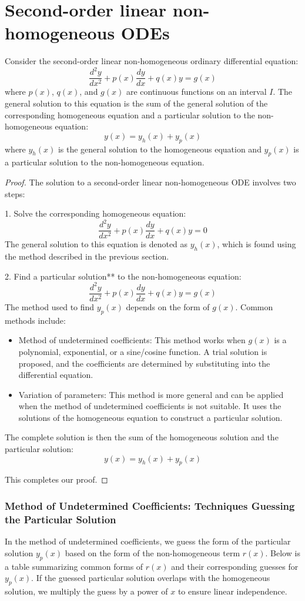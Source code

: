 \section{Second-order linear non-homogeneous ODEs}
\begin{theorem}
Consider the second-order linear non-homogeneous ordinary differential equation:
\[
\frac{d^2 y}{dx^2} + p(x)\frac{dy}{dx} + q(x)y = g(x)
\]
where $p(x)$, $q(x)$, and $g(x)$ are continuous functions on an interval $I$. The general solution to this equation is the sum of the general solution of the corresponding homogeneous equation and a particular solution to the non-homogeneous equation:
\[
y(x) = y_h(x) + y_p(x)
\]
where $y_h(x)$ is the general solution to the homogeneous equation and $y_p(x)$ is a particular solution to the non-homogeneous equation.
\end{theorem}

\begin{proof}
The solution to a second-order linear non-homogeneous ODE involves two steps:

1. Solve the corresponding homogeneous equation:
\[
\frac{d^2 y}{dx^2} + p(x)\frac{dy}{dx} + q(x)y = 0
\]
The general solution to this equation is denoted as $y_h(x)$, which is found using the method described in the previous section.

2. Find a particular solution** to the non-homogeneous equation:
\[
\frac{d^2 y}{dx^2} + p(x)\frac{dy}{dx} + q(x)y = g(x)
\]
The method used to find $y_p(x)$ depends on the form of $g(x)$. Common methods include:
\begin{itemize}
    \item Method of undetermined coefficients: This method works when $g(x)$ is a polynomial, exponential, or a sine/cosine function. A trial solution is proposed, and the coefficients are determined by substituting into the differential equation.
    \item Variation of parameters: This method is more general and can be applied when the method of undetermined coefficients is not suitable. It uses the solutions of the homogeneous equation to construct a particular solution.
\end{itemize}

The complete solution is then the sum of the homogeneous solution and the particular solution:
\[
y(x) = y_h(x) + y_p(x)
\]

This completes our proof.
\end{proof}
\subsubsection*{Method of Undetermined Coefficients: Techniques Guessing the Particular Solution}
In the method of undetermined coefficients, we guess the form of the particular solution \( y_p(x) \) based on the form of the non-homogeneous term \( r(x) \). Below is a table summarizing common forms of \( r(x) \) and their corresponding guesses for \( y_p(x) \). If the guessed particular solution overlaps with the homogeneous solution, we multiply the guess by a power of \( x \) to ensure linear independence.

